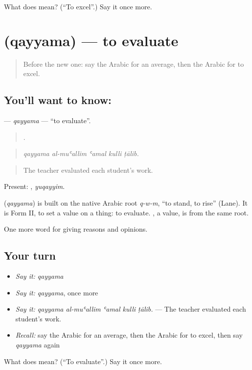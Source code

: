 \begin{tcolorbox}[breakable,colback=teal!4,colframe=teal!35!black,title={Before you move on}]
What does  mean? (\textquotedblleft{}To excel\textquotedblright{}.) Say it once more.
\end{tcolorbox}
\section[\texorpdfstring{\ar{قيم} (qayyama)}{قيم (qayyama)}]{ (qayyama) — to evaluate}

\label{lesson:AR-C393-qayyama}



\begin{quote}
Before the new one: say the Arabic for an average, then the Arabic for to excel.
\end{quote}

\subsection*{You'll want to know: }
\textbf{} — \emph{qayyama} — \textquotedblleft{}to evaluate\textquotedblright{}.

\begin{quote}
    .
\end{quote}

\begin{quote}
\emph{qayyama al-muʿallim ʿamal kulli ṭālib.}
\end{quote}

\begin{quote}
The teacher evaluated each student's work.
\end{quote}

Present: , \emph{yuqayyim}.

\begin{cousinweb}
\textbf{} (\emph{qayyama}) is built on the native Arabic root \emph{q-w-m}, \textquotedblleft{}to stand, to rise\textquotedblright{} (Lane). It is Form II, to set a value on a thing: to evaluate. , a value, is from the same root.
\end{cousinweb}

\begin{grammarlens}[title={What you've built}]
One more word for giving reasons and opinions.
\end{grammarlens}

\subsection*{Your turn}
\begin{itemize}
\raggedright
  \item \emph{Say it:} \emph{qayyama}
  \item \emph{Say it:} \emph{qayyama}, once more
  \item \emph{Say it:} \emph{qayyama al-muʿallim ʿamal kulli ṭālib.} — The teacher evaluated each student's work.
  \item \emph{Recall:} say the Arabic for an average, then the Arabic for to excel, then say \emph{qayyama} again
\end{itemize}

\begin{tcolorbox}[breakable,colback=teal!4,colframe=teal!35!black,title={Before you move on}]
What does  mean? (\textquotedblleft{}To evaluate\textquotedblright{}.) Say it once more.
\end{tcolorbox}
